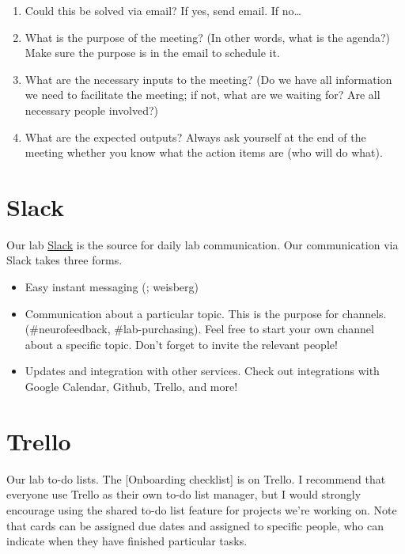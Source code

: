 \documentclass[
  12pt,
]{book}
\begin{document}
\begin{enumerate}
\def\labelenumi{\arabic{enumi}.}
\item
  Could this be solved via email?
  If yes, send email. If no\ldots{}
\item
  What is the purpose of the meeting? (In other words, what is the agenda?) Make sure the purpose is in the email to schedule it.
\item
  What are the necessary inputs to the meeting? (Do we have all information we need to facilitate the meeting; if not, what are we waiting for? Are all necessary people involved?)
\item
  What are the expected outputs? Always ask yourself at the end of the meeting whether you know what the action items are (who will do what).
\end{enumerate}

\hypertarget{slack}{%
\section{Slack}\label{slack}}

Our lab \href{scannlab.slack.com}{Slack} is the source for daily lab communication. Our communication via Slack takes three forms.

\begin{itemize}
\item
  Easy instant messaging (\citet{everyone}; \citet{steve} weisberg)
\item
  Communication about a particular topic. This is the purpose for channels. (\#neurofeedback, \#lab-purchasing). Feel free to start your own channel about a specific topic. Don't forget to invite the relevant people!
\item
  Updates and integration with other services. Check out integrations with Google Calendar, Github, Trello, and more!
\end{itemize}

\hypertarget{trello}{%
\section{Trello}\label{trello}}

Our lab to-do lists. The {[}Onboarding checklist{]} is on Trello. I recommend that everyone use Trello as their own to-do list manager, but I would strongly encourage using the shared to-do list feature for projects we're working on. Note that cards can be assigned due dates and assigned to specific people, who can indicate when they have finished particular tasks.
\end{document}

